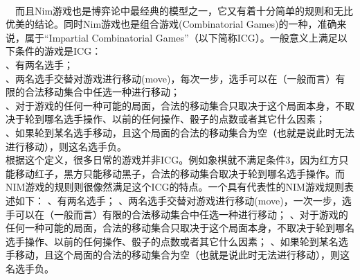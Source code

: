 \documentclass[UTF8,nofonts,cs4size]{ctexrep}
\begin{document}
\paragraph{}
\indent\ \ 
而且Nim游戏也是博弈论中最经典的模型之一，它又有着十分简单的规则和无比优美的结论。同时Nim游戏也是组合游戏(Combinatorial Games)的一种，准确来说，属于“Impartial Combinatorial Games”（以下简称ICG）。一般意义上满足以下条件的游戏是ICG：
\\ \indent 1、有两名选手；
\\ 、两名选手交替对游戏进行移动(move)，每次一步，选手可以在（一般而言）有限的合法移动集合中任选一种进行移动；
\\ \indent 3、对于游戏的任何一种可能的局面，合法的移动集合只取决于这个局面本身，不取决于轮到哪名选手操作、以前的任何操作、骰子的点数或者其它什么因素；
\\ \indent 4、如果轮到某名选手移动，且这个局面的合法的移动集合为空（也就是说此时无法进行移动），则这名选手负。
\\ 根据这个定义，很多日常的游戏并非ICG。例如象棋就不满足条件3，因为红方只能移动红子，黑方只能移动黑子，合法的移动集合取决于轮到哪名选手操作。而NIM游戏的规则则很像然满足这个ICG的特点。一个具有代表性的NIM游戏规则表述如下：
\newline
{}、有两名选手；
\newline
{}、两名选手交替对游戏进行移动(move)，一次一步，选手可以在（一般而言）有限的合法移动集合中任选一种进行移动；
\newline
{}、对于游戏的任何一种可能的局面，合法的移动集合只取决于这个局面本身，不取决于轮到哪名选手操作、以前的任何操作、骰子的点数或者其它什么因素；
\newline
{}、如果轮到某名选手移动，且这个局面的合法的移动集合为空（也就是说此时无法进行移动），则这名选手负。
\end{document}
